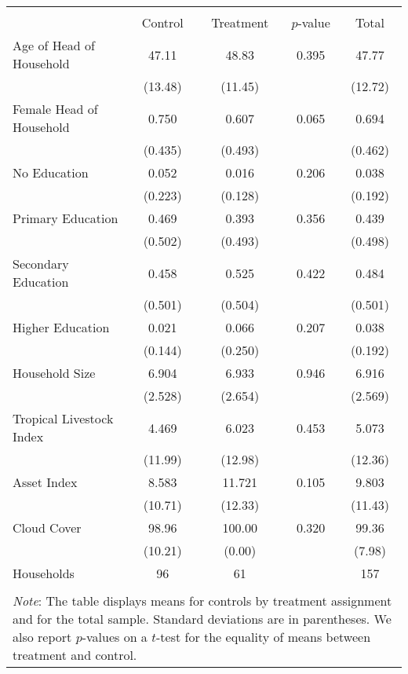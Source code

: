\begin{tabular}{l*{4}{c}} \\ [-1.8ex]\hline \hline \\[-1.8ex] 
& \multicolumn{1}{c}{Control} & \multicolumn{1}{c}{Treatment} &  
\multicolumn{1}{c}{$p$-value} & \multicolumn{1}{c}{Total}  \\ 
\midrule
Age of Head of Household&       47.11&       48.83&       0.395&       47.77\\
                    &     (13.48)&     (11.45)&            &     (12.72)\\
Female Head of Household&       0.750&       0.607&       0.065&       0.694\\
                    &     (0.435)&     (0.493)&            &     (0.462)\\
No Education        &       0.052&       0.016&       0.206&       0.038\\
                    &     (0.223)&     (0.128)&            &     (0.192)\\
Primary Education   &       0.469&       0.393&       0.356&       0.439\\
                    &     (0.502)&     (0.493)&            &     (0.498)\\
Secondary Education &       0.458&       0.525&       0.422&       0.484\\
                    &     (0.501)&     (0.504)&            &     (0.501)\\
Higher Education    &       0.021&       0.066&       0.207&       0.038\\
                    &     (0.144)&     (0.250)&            &     (0.192)\\
Household Size      &       6.904&       6.933&       0.946&       6.916\\
                    &     (2.528)&     (2.654)&            &     (2.569)\\
Tropical Livestock Index&       4.469&       6.023&       0.453&       5.073\\
                    &     (11.99)&     (12.98)&            &     (12.36)\\
Asset Index         &       8.583&      11.721&       0.105&       9.803\\
                    &     (10.71)&     (12.33)&            &     (11.43)\\
Cloud Cover         &       98.96&      100.00&       0.320&       99.36\\
                    &     (10.21)&      (0.00)&            &      (7.98)\\
 \midrule Households &   96 &   61 & &  157 \\ 
\hline \hline \\[-1.8ex] \multicolumn{5}{J{\linewidth}}{\small 
\noindent \textit{Note}: The table displays means for controls 
by treatment assignment and for the total sample. Standard deviations are in 
parentheses. We also report $p$-values 
on a $t$-test for the equality of means between treatment and control.}  \end{tabular}
